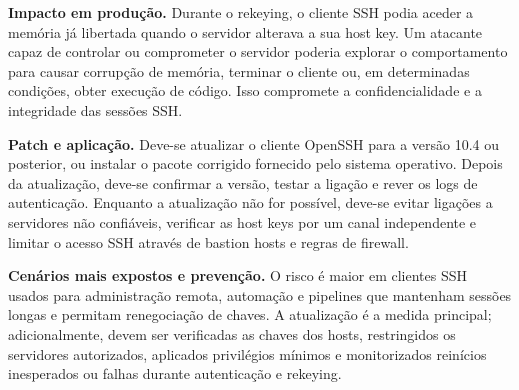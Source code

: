 \documentclass[11pt,a4paper]{article}
\begin{document}
\textbf{Impacto em produção.} Durante o rekeying, o cliente SSH podia aceder a memória já libertada quando o servidor alterava a sua host key. Um atacante capaz de controlar ou comprometer o servidor poderia explorar o comportamento para causar corrupção de memória, terminar o cliente ou, em determinadas condições, obter execução de código. Isso compromete a confidencialidade e a integridade das sessões SSH.

\textbf{Patch e aplicação.} Deve-se atualizar o cliente OpenSSH para a versão 10.4 ou posterior, ou instalar o pacote corrigido fornecido pelo sistema operativo. Depois da atualização, deve-se confirmar a versão, testar a ligação e rever os logs de autenticação. Enquanto a atualização não for possível, deve-se evitar ligações a servidores não confiáveis, verificar as host keys por um canal independente e limitar o acesso SSH através de bastion hosts e regras de firewall.

\textbf{Cenários mais expostos e prevenção.} O risco é maior em clientes SSH usados para administração remota, automação e pipelines que mantenham sessões longas e permitam renegociação de chaves. A atualização é a medida principal; adicionalmente, devem ser verificadas as chaves dos hosts, restringidos os servidores autorizados, aplicados privilégios mínimos e monitorizados reinícios inesperados ou falhas durante autenticação e rekeying.
\end{document}
